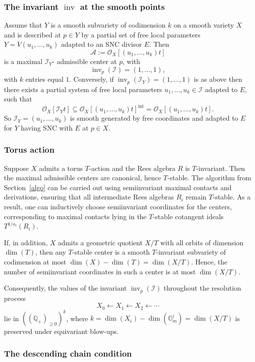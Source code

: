 \documentclass{amsart}
\newcommand{\cA}{{\mathcal A}}
\newcommand{\cI}{{\mathcal I}}
\newcommand{\cO}{{\mathcal O}}
\newcommand{\inv}{{\operatorname{inv}}}
\newcommand{\inte}{{\operatorname{int}}}
\begin{document}
\subsubsection{The invariant $\inv$ at the smooth points}\label{invv}
Assume that $Y$ is a smooth subvariety of codimension  $k$  on a smooth variety $X$ and is described at  $p\in Y$ by a partial set of free local parameters $Y=V(u_1,\ldots,u_k)$  adapted  to an SNC divisor $E$.
Then  $$\cA:=\cO_X[(u_1,\ldots,u_k)t]$$  is a maximal $\cI_Y$- admissible center at $p$, with $$\inv_p(\cI)=(1,\ldots,1),$$ with $k$ entries equal $1$. Conversely, if
$\inv_p(\cI_Y)=(1,\ldots,1)$ is as above then there exists a partial system  of free local parameters $u_1,\ldots,u_k\in \cI$ adapted to  $E$, such that $$\cO_X[\cI_Yt]\subseteq \cO_X[(u_1,\ldots,u_k)t]^\inte=\cO_X[(u_1,\ldots,u_k)t].$$  So $\cI_Y=(u_1,\ldots,u_k)$ is smooth  generated by free coordinates and  adapted  to  $E$ for $Y$ having SNC with $E$ at $p\in X$.


\subsubsection{Torus action} \label{tor}

Suppose \( X \) admits a torus \( T \)-action and the Rees algebra \( R \) is \( T \)-invariant. Then the maximal admissible centers are canonical, hence \( T \)-stable. The algorithm from Section~\ref{algo} can be carried out using semiinvariant maximal contacts and derivations, ensuring that all intermediate Rees algebras \( R_i \) remain \( T \)-stable. As a result, one can inductively choose semiinvariant coordinates for the centers, corresponding to  maximal contacts lying in the \( T \)-stable cotangent ideals \( T^{1/a_i}(R_i) \).

If, in addition, \( X \) admits a geometric quotient \( X/T \) with all orbits of dimension \( \dim(T) \), then any \( T \)-stable center is a smooth \( T \)-invariant subvariety of codimension at most \( \dim(X) - \dim(T) = \dim(X/T) \). Hence, the number of semiinvariant coordinates in such a center is at most \( \dim(X/T) \).

Consequently, the values of the invariant \( \inv_p(\cI) \) throughout the resolution process
\[
X_0 \leftarrow X_1 \leftarrow X_2 \leftarrow \cdots
\]
lie in \( ((\mathbb{Q}_+)_{\geq 0})^k \), where \( k = \dim(X_i) - \dim(\mathbb{G}_m^i) = \dim(X/T) \) is preserved under equivariant blow-ups.
\subsubsection{The descending chain condition}
\end{document}
